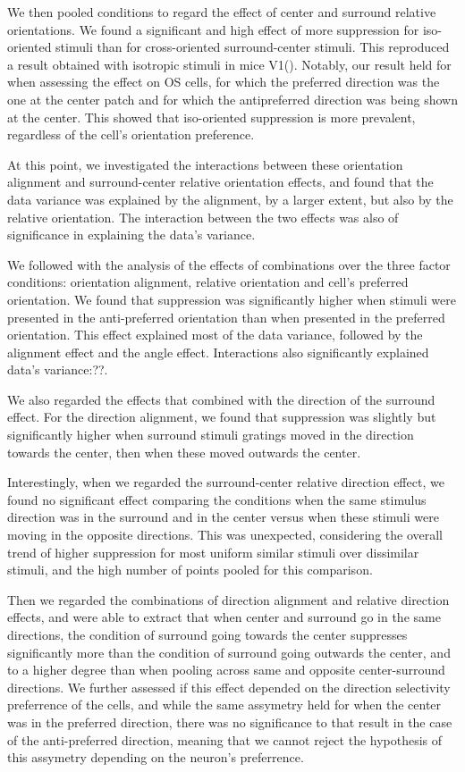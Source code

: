 We then pooled conditions to regard the effect of center and surround relative orientations. We found a significant and high effect of more suppression for iso-oriented stimuli than for cross-oriented surround-center stimuli. This reproduced a result obtained with isotropic stimuli in mice V1(\cite{Self2014}). Notably, our result held for when assessing the effect on OS cells, for which the preferred direction was the one at the center patch and for which the antipreferred direction was being shown at the center. This showed that iso-oriented suppression is more prevalent, regardless of the cell's orientation preference.

At this point, we investigated the interactions between these orientation alignment and surround-center relative orientation effects, and found that the data variance was explained by the alignment, by a larger extent, but also by the relative orientation. The interaction between the two effects was also of significance in explaining the data's variance.

We followed with the analysis of the effects of combinations over the three factor conditions: orientation alignment, relative orientation and cell's preferred orientation. We found that suppression was significantly higher when stimuli were presented in the anti-preferred orientation than when presented in the preferred orientation. This effect explained most of the data variance, followed by the alignment effect and the angle effect. Interactions also significantly explained data's variance:??.

We also regarded the effects that combined with the direction of the surround effect. For the direction alignment, we found that suppression was slightly but significantly higher when surround stimuli gratings moved in the direction towards the center, then when these moved outwards the center.

Interestingly, when we regarded the surround-center relative direction effect, we found no significant effect comparing the conditions when the same stimulus direction was in the surround and in the center versus when these stimuli were moving in the opposite directions. This was unexpected, considering the overall trend of higher suppression for most uniform similar stimuli over dissimilar stimuli, and the high number of points pooled for this comparison.

Then we regarded the combinations of direction alignment and relative direction effects, and were able to extract that when center and surround go in the same directions, the condition of surround going towards the center suppresses significantly more than the condition of surround going outwards the center, and to a higher degree than when pooling across same and opposite center-surround directions. We further assessed if this effect depended on the direction selectivity preferrence of the cells, and while the same assymetry held for when the center was in the preferred direction, there was no significance to that result in the case of the anti-preferred direction, meaning that we cannot reject the hypothesis of this assymetry depending on the neuron's preferrence.

